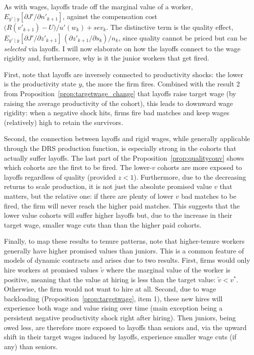As with wages, layoffs trade off the marginal value of a worker, $E_{y'\mid y}[\partial J'/\partial n'_{k+1}]$, against the compensation cost $\big(R(v'_{k+1})-U\big)/u'(w_k)+sev_k$. The distinctive term is the quality effect,
$E_{y'\mid y}[\partial J'/\partial z'_{k+1}]\,(\partial z'_{k+1}/\partial s_k)/n_k$, since quality cannot be priced but can be \emph{selected} via layoffs. I will now elaborate on how the layoffs connect to the wage rigidity and, furthermore, why is it the junior workers that get fired.

First, note that layoffs are inversely connected to productivity shocks: the lower is the productivity state $y$, the more the firm fires. Combined with the result 2 from Proposition~\ref{prop:targetwage_change} that layoffs raise target wage (by raising the average productivity of the cohort), this leads to downward wage rigidity: when a negative shock hits, firms fire bad matches and keep wages (relatively) high to retain the survivors.

Second, the connection between layoffs and rigid wages, while generally applicable through the DRS production function, is especially strong in the cohorts that actually suffer layoffs. The last part of the Proposition~\ref{prop:qualityconv} shows which cohorts are the first to be fired. The lower-$v$ cohorts are more exposed to layoffs regardless of quality (provided $z<1$). Furthermore, due to the decreasing returns to scale production, it is not just the absolute promised value $v$ that matters, but the relative one: if there are plenty of lower $v$ bad matches to be fired, the firm will never reach the higher paid matches. This suggests that the lower value cohorts will suffer higher layoffs but, due to the increase in their target wage, smaller wage cuts than than the higher paid cohorts.

Finally, to map these results to tenure patterns, note that higher-tenure workers generally have higher promised values than juniors. This is a common feature of models of dynamic contracts and arises due to two results. First, firms would only hire workers at promised values $\tilde{v}$ where the marginal value of the worker is positive, meaning that the value at hiring is less than the target value: $\tilde{v}< v^*$. Otherwise, the firm would not want to hire at all. Second, due to wage backloading (Proposition~\ref{prop:targetwage}, item 1), these new hires will experience both wage and value rising over time (main exception being a persistent negative productivity shock right after hiring). Then juniors, being owed less, are therefore more exposed to layoffs than seniors and, via the upward shift in their target wages induced by layoffs, experience smaller wage cuts (if any) than seniors.

